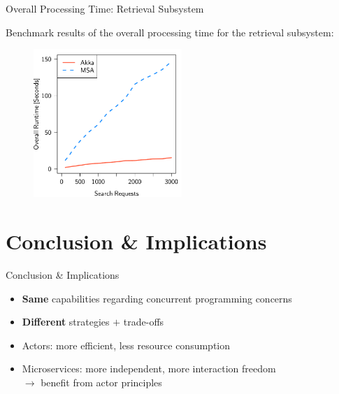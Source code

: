\documentclass{beamer}
\begin{document}

\begin{frame}{Overall Processing Time: Retrieval Subsystem}

Benchmark results of the overall processing time for the retrieval subsystem:

\begin{center}
  \begin{figure} 
    \includegraphics[width=0.5\textwidth]{graphics/eval-search-rtt-overall.pdf} 
  \end{figure}
\end{center}

\end{frame}


\section{Conclusion \& Implications}


\begin{frame}{Conclusion \& Implications}

\begin{itemize}
  \item \textbf{Same} capabilities regarding concurrent programming concerns
  \item \textbf{Different} strategies $+$ trade-offs
  \item Actors: more efficient, less resource consumption
  \item Microservices: more independent, more interaction freedom \\%
        $\rightarrow$ benefit from actor principles 
\end{itemize}

\end{frame}
\end{document}
